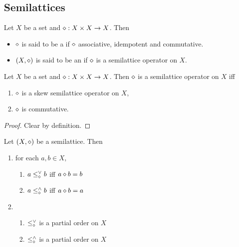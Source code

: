\documentclass{book}
\begin{document}
	
	
	
	
	
	
	\newpage
	
	\subsection{Semilattices}
	
	\begin{defn} 
		Let $X$ be a set and $\diamond:X \times X \rightarrow X$. 
		Then 
		\begin{itemize}
			\item $\diamond$ is said to be a  if $\diamond$ associative, idempotent and commutative.
			\item $(X, \diamond)$ is said to be an  if $\diamond$ is a semilattice operator on $X$.
		\end{itemize}
	\end{defn}
	
	\begin{ex} 
		Let $X$ be a set and $\diamond:X \times X \rightarrow X$. 
		Then $\diamond$ is a semilattice operator on $X$ iff 
		\begin{enumerate}
			\item $\diamond$ is a skew semilattice operator on $X$, \item $\diamond$ is commutative.
		\end{enumerate}
	\end{ex}
	
	\begin{proof}
		Clear by definition. 
	\end{proof}
	
	\begin{ex} 
		Let $(X, \diamond)$ be a semilattice. Then 
		\begin{enumerate}
			\item for each $a, b \in X$,
			\begin{enumerate}
				\item $a \leq^{\vee}_{\diamond} b$ iff $a \diamond b = b$
				\item $a \leq^{\wedge}_{\diamond} b$ iff $a \diamond b = a$
			\end{enumerate}
			\item 
			\begin{enumerate}
				\item $\leq^{\vee}_{\diamond}$ is a partial order on $X$
				\item $\leq^{\wedge}_{\diamond}$ is a partial order on $X$
			\end{enumerate}
		\end{enumerate}
	\end{ex}
	
\end{document}
